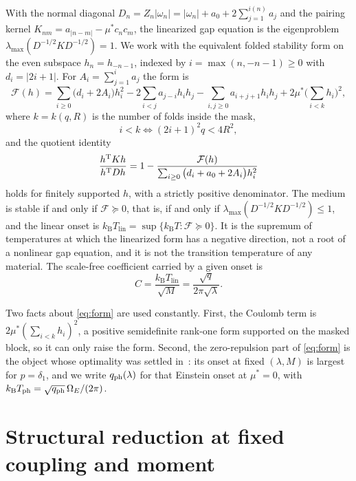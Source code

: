 \documentclass[11pt]{article}
\newcommand{\kb}{k_{\mathrm B}}
\newcommand{\Tlin}{T_{\mathrm{lin}}}
\newcommand{\OmE}{\Omega_E}
\newcommand{\Fcal}{\mathcal F}
\newcommand{\muS}{\mu^{*}}
\theoremstyle{definition}
\theoremstyle{remark}
\begin{document}
With the normal diagonal $D_n=Z_n|\omega_n|=|\omega_n|+a_0+2\sum_{j=1}^{i(n)}a_j$ and the
pairing kernel $K_{nm}=a_{|n-m|}-\muS c_nc_m$, the linearized gap equation is the
eigenproblem $\lambda_{\max}(D^{-1/2}KD^{-1/2})=1$. We work with the equivalent folded
stability form on the even subspace $h_n=h_{-n-1}$, indexed by
$i=\max(n,-n-1)\ge0$ with $d_i=|2i+1|$. For $A_i=\sum_{j=1}^{i}a_j$ the form is
\begin{equation}\label{eq:form}
\Fcal(h)=\sum_{i\ge0}\big(d_i+2A_i\big)h_i^2
-2\sum_{i<j}a_{j-i}h_ih_j
-\sum_{i,j\ge0}a_{i+j+1}h_ih_j
+2\muS\Big(\sum_{i<k}h_i\Big)^2 ,
\end{equation}
where $k=k(q,R)$ is the number of folds inside the mask,
\begin{equation}\label{eq:mask}
i<k\iff (2i+1)^2q<4R^2 ,
\end{equation}
and the quotient identity
\begin{equation}\label{eq:quotient}
\frac{h^{\rm T}Kh}{h^{\rm T}Dh}
=1-\frac{\Fcal(h)}{\sum_{i\ge0}\big(d_i+a_0+2A_i\big)h_i^2}
\end{equation}
holds for finitely supported $h$, with a strictly positive denominator. The medium is
stable if and only if $\Fcal\succeq0$, that is, if and only if
$\lambda_{\max}(D^{-1/2}KD^{-1/2})\le1$, and the linear onset is
$\kb\Tlin=\sup\{\kb T:\Fcal\succeq0\}$. It is the supremum of temperatures at which the
linearized form has a negative direction, not a root of a nonlinear gap equation, and it
is not the transition temperature of any material. The scale-free coefficient carried by
a given onset is
\begin{equation}\label{eq:C}
C=\frac{\kb\Tlin}{\sqrt M}=\frac{\sqrt q}{2\pi\sqrt\lambda}.
\end{equation}

Two facts about \eqref{eq:form} are used constantly. First, the Coulomb term is
$2\muS(\sum_{i<k}h_i)^2$, a positive semidefinite rank-one form supported on the masked
block, so it can only raise the form. Second, the zero-repulsion part of \eqref{eq:form}
is the object whose optimality was settled in~\cite{rens,kondratev}: its onset at fixed
$(\lambda,M)$ is largest for $p=\delta_1$, and we write $q_{\rm ph}(\lambda)$ for that
Einstein onset at $\muS=0$, with $\kb T_{\rm ph}=\sqrt{q_{\rm ph}}\,\OmE/(2\pi)$.

\section{Structural reduction at fixed coupling and moment}\label{sec:reduce}
\end{document}

